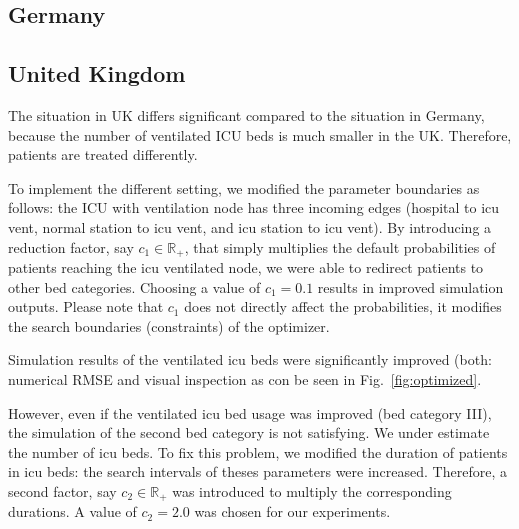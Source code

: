 \documentclass[conference]{IEEEtran}
\begin{document}
\subsection{Germany}



\subsection{United Kingdom}
The situation in UK differs significant compared to the situation in Germany, because the number of ventilated ICU beds is much smaller in the UK. 
Therefore, patients are treated differently. 

To implement the different setting, we modified the parameter boundaries as follows: the ICU with ventilation node has three incoming edges (hospital to icu vent, normal station to icu vent, and icu station to icu vent).
By introducing a reduction factor, say  $c_1 \in \mathbb{R_+}$, that simply multiplies the default probabilities of patients reaching the icu ventilated node, we were able to redirect patients to other bed categories. 
Choosing a value of $c_1=0.1$ results in improved simulation outputs. Please note that $c_1$ does not directly affect the probabilities, it modifies the search boundaries (constraints) of the optimizer.

Simulation results of the ventilated icu beds were significantly improved (both: numerical RMSE and visual inspection as con be seen in Fig.~\ref{fig:optimized}.

However, even if the ventilated icu bed usage was improved (bed category III), the simulation of the second bed category is not satisfying. We under estimate the number of icu beds.
To fix this problem, we modified the duration of patients in icu beds: the search intervals of theses parameters were increased. Therefore, a second factor, say $c_2 \in \mathbb{R}_+$ was introduced to multiply the corresponding durations. A value of $c_2 = 2.0$ was chosen for our experiments.
\end{document}
